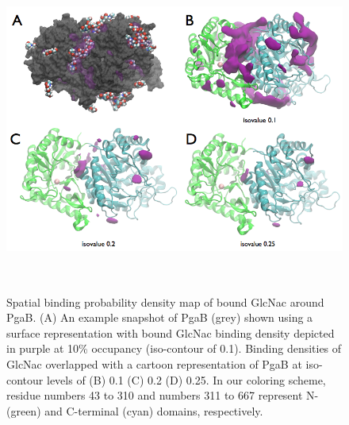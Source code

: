 \begin{figure}[htbp]
\centering
\includegraphics[height=4.25in, width=6in]{figures/results4/figure_pgab_density.png}
\caption[NAG binding density]{Spatial binding probability density map of bound GlcNac around PgaB.  (A) An example snapshot of PgaB (grey) shown using a surface representation with bound GlcNac binding density depicted in purple at 10\% occupancy (iso-contour of 0.1). Binding densities of GlcNac overlapped with a cartoon representation of PgaB at iso-contour levels of (B) 0.1 (C) 0.2 (D) 0.25. In our coloring scheme, residue numbers 43 to 310 and numbers 311 to 667 represent N- (green) and C-terminal (cyan) domains, respectively.  }
\label{fig:pgab_density}
\end{figure}

